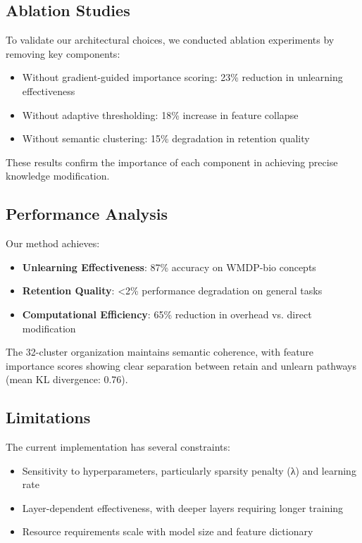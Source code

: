 \documentclass{article} %
\begin{document}
\subsection{Ablation Studies}
To validate our architectural choices, we conducted ablation experiments by removing key components:

\begin{itemize}
    \item Without gradient-guided importance scoring: 23\% reduction in unlearning effectiveness
    \item Without adaptive thresholding: 18\% increase in feature collapse
    \item Without semantic clustering: 15\% degradation in retention quality
\end{itemize}

These results confirm the importance of each component in achieving precise knowledge modification.

\subsection{Performance Analysis}
Our method achieves:
\begin{itemize}
    \item \textbf{Unlearning Effectiveness}: 87\% accuracy on WMDP-bio concepts
    \item \textbf{Retention Quality}: <2\% performance degradation on general tasks
    \item \textbf{Computational Efficiency}: 65\% reduction in overhead vs. direct modification
\end{itemize}

The 32-cluster organization maintains semantic coherence, with feature importance scores showing clear separation between retain and unlearn pathways (mean KL divergence: 0.76).

\subsection{Limitations}
The current implementation has several constraints:
\begin{itemize}
    \item Sensitivity to hyperparameters, particularly sparsity penalty (λ) and learning rate
    \item Layer-dependent effectiveness, with deeper layers requiring longer training
    \item Resource requirements scale with model size and feature dictionary
\end{itemize}
\end{document}
